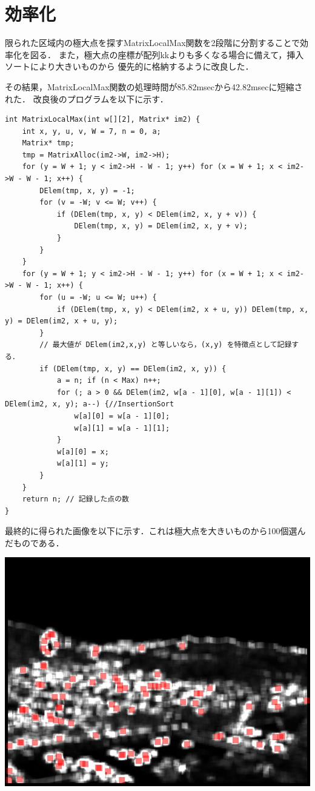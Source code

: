 \documentclass[11pt]{jarticle}
\begin{document}
\section{効率化}

限られた区域内の極大点を探すMatrixLocalMax関数を2段階に分割することで効率化を図る．
また，極大点の座標が配列kkよりも多くなる場合に備えて，挿入ソートにより大きいものから
優先的に格納するように改良した．

その結果，MatrixLocalMax関数の処理時間が85.82msecから42.82msecに短縮された．
改良後のプログラムを以下に示す．

\begin{lstlisting}
int MatrixLocalMax(int w[][2], Matrix* im2) {
    int x, y, u, v, W = 7, n = 0, a;
    Matrix* tmp;
    tmp = MatrixAlloc(im2->W, im2->H);
    for (y = W + 1; y < im2->H - W - 1; y++) for (x = W + 1; x < im2->W - W - 1; x++) {
        DElem(tmp, x, y) = -1;
        for (v = -W; v <= W; v++) {
            if (DElem(tmp, x, y) < DElem(im2, x, y + v)) {
                DElem(tmp, x, y) = DElem(im2, x, y + v);
            }
        }
    }
    for (y = W + 1; y < im2->H - W - 1; y++) for (x = W + 1; x < im2->W - W - 1; x++) {
        for (u = -W; u <= W; u++) {
            if (DElem(tmp, x, y) < DElem(im2, x + u, y)) DElem(tmp, x, y) = DElem(im2, x + u, y);
        }
        // 最大値が DElem(im2,x,y) と等しいなら，(x,y) を特徴点として記録する． 
        if (DElem(tmp, x, y) == DElem(im2, x, y)) {
            a = n; if (n < Max) n++;
            for (; a > 0 && DElem(im2, w[a - 1][0], w[a - 1][1]) < DElem(im2, x, y); a--) {//InsertionSort
                w[a][0] = w[a - 1][0];
                w[a][1] = w[a - 1][1];
            }
            w[a][0] = x;
            w[a][1] = y;
        }
    }
    return n; // 記録した点の数 
}
\end{lstlisting}

最終的に得られた画像を以下に示す．これは極大点を大きいものから100個選んだものである．

\includegraphics[scale=.6]{./img/out.jpg}
\end{document}
